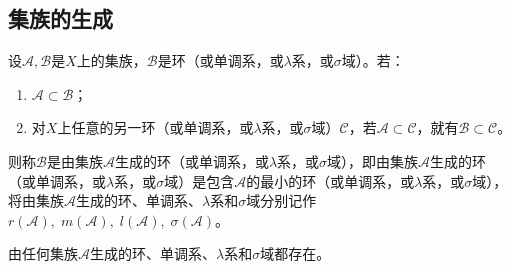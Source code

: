 \subsection{集族的生成}
\begin{definition}
	设$\mathscr{A},\mathscr{B}$是$X$上的集族，$\mathscr{B}$是环（或单调系，或$\lambda$系，或$\sigma$域）。若：
	\begin{enumerate}
		\item $\mathscr{A}\subset\mathscr{B}$；
		\item 对$X$上任意的另一环（或单调系，或$\lambda$系，或$\sigma$域）$\mathscr{C}$，若$\mathscr{A}\subset\mathscr{C}$，就有$\mathscr{B}\subset\mathscr{C}$。
	\end{enumerate}
	则称$\mathscr{B}$是由集族$\mathscr{A}$生成的环（或单调系，或$\lambda$系，或$\sigma$域），即由集族$\mathscr{A}$生成的环（或单调系，或$\lambda$系，或$\sigma$域）是包含$\mathscr{A}$的最小的环（或单调系，或$\lambda$系，或$\sigma$域），将由集族$\mathscr{A}$生成的环、单调系、$\lambda$系和$\sigma$域分别记作$r(\mathscr{A}),\;m(\mathscr{A}),\;l(\mathscr{A}),\;\sigma(\mathscr{A})$。
\end{definition}
\begin{theorem}
	由任何集族$\mathscr{A}$生成的环、单调系、$\lambda$系和$\sigma$域都存在。
\end{theorem}
